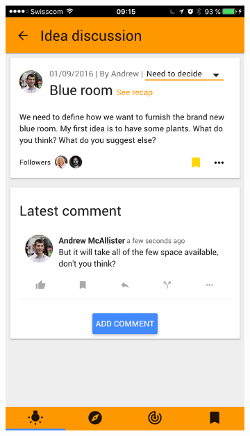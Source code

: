 \documentclass[a4paper,12pt, oneside]{article}
\begin{document}
\begin{figure}[!htb]
    \null\hfill
    \begin{subfigure}{.32\textwidth}
        \centering
        \includegraphics[width=\textwidth]{images/classificationSelect_selected.png}
    \end{subfigure}
    \hfill
    \begin{subfigure}{.32\textwidth}
        \centering

\end{subfigure}
\end{figure}
\end{document}
